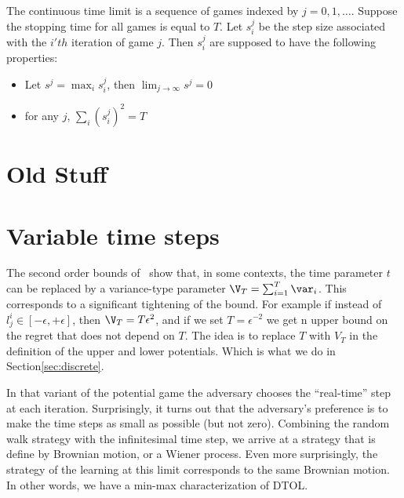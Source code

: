 
\iffalse
\begin{definition}
The continuous time limit is a sequence of games indexed by
$j=0,1,\ldots$. Suppose the stopping time for all games is equal to
$T$.
Let $s_i^j$ be the step size associated with the
$i'th$ iteration of game $j$. Then $s_i^j$ are supposed to have the
following properties:
\begin{itemize}
\item Let $s^j = \max_i s_i^j$, then $\lim_{j \to \infty} s^j = 0$
  \item for any $j$, $\sum_i (s_i^j)^2 = T$
\end{itemize}
  \end{definition}

\section{Old Stuff}





\section{Variable time steps}
The second order bounds of~\cite{cesa2007improved} show that, in some
contexts, the time parameter $t$ can be replaced by a variance-type
parameter $\V_T= \sum_{i=1}^T \var_i$. This corresponds to a
significant tightening of the bound. For example if instead of $l_j^i
\in [-\epsilon,+\epsilon]$, then $\V_T = T\epsilon^2$, and if we set
$T=\epsilon^{-2}$ we get n upper bound on the regret that does not
depend on $T$. The idea is to replace $T$ with $V_T$ in the definition
of the upper and lower potentials. Which is what we do in
Section\ref{sec:discrete}.

In that variant of the potential game the adversary chooses the
``real-time'' step at each iteration. Surprisingly, it turns out that
the adversary's preference is to make the time steps as small as
possible (but not zero). Combining the random walk strategy with the
infinitesimal time step, we arrive at a strategy that is define by
Brownian motion, or a Wiener process. Even more surprisingly, the
strategy of the learning at this limit corresponds to the same
Brownian motion. In other words, we have a min-max characterization of
DTOL.

